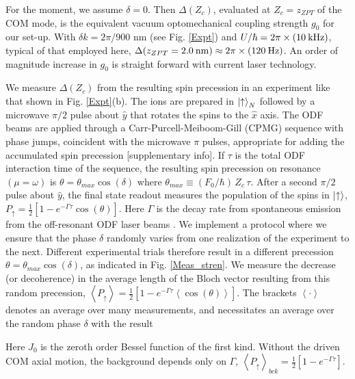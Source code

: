 \documentclass[aps,prl,twocolumn,superscriptaddress,floatfix,nofootinbib]{revtex4-1}
\begin{document}
For the moment, we assume $\delta=0$. Then $\Delta(Z_c)$, evaluated at $Z_c = z_{ZPT}$ of the COM mode, is the equivalent vacuum optomechanical coupling strength $g_0$ \citep{Aspelmeyer2014} for our set-up. With $\delta k =2\pi/900$ nm (see Fig. \ref{Expt}) and $U/\hbar = 2\pi \times (10\:\rm{kHz})$, typical of that employed here, $\Delta(z_{ZPT} = 2.0\:\rm{nm}) \approx 2\pi \times (120\:\rm{Hz})$. An order of magnitude increase in $g_0$ is straight forward with current laser technology.

We measure $\Delta(Z_c)$ from the resulting spin precession in an experiment like that shown in Fig. \ref{Expt}(b). The ions are prepared in $\ket{\uparrow}_N$ followed by a microwave $\pi/2$ pulse about $\hat{y}$ that rotates the spins to the $\hat{x}$ axis. The ODF beams are applied through a Carr-Purcell-Meiboom-Gill (CPMG) sequence with phase jumps, coincident with the microwave $\pi$ pulses, appropriate for adding the accumulated spin precession \citep{Kotler2011}[supplementary info]. If $\tau$ is the total ODF interaction time of the sequence, the resulting spin precession on resonance $(\mu = \omega)$ is $\theta = \theta_{max} \cos(\delta)$ where $\theta_{max} \equiv (F_{0}/\hbar)\, Z_c \, \tau$. After a second $\pi/2$ pulse about $\hat{y}$, the final state readout measures the population of the spins in $\ket{\uparrow}$, $P_{\uparrow} = \frac{1}{2}[1-e^{-\Gamma \tau}\cos(\theta)]$. Here $\Gamma$ is the decay rate from spontaneous emission from the off-resonant ODF laser beams \citep{Uys2010}. We implement a protocol where we ensure that the phase $\delta$ randomly varies from one realization of the experiment to the next. Different experimental trials therefore result in a different precession $\theta = \theta_{max} \cos(\delta)$, as indicated in Fig. \ref{Meas_stren}. We measure the decrease (or decoherence) in the average length of the Bloch vector resulting from this random precession, $\left< P_{\uparrow} \right> = \frac{1}{2}[1-e^{-\Gamma \tau} \left<\cos(\theta)\right>]$. The brackets $ \left< \cdot \right> $ denotes an average over many measurements, and necessitates an average over the random phase $\delta$ with the result \citep{Kotler2013}

Here $J_0$ is the zeroth order Bessel function of the first kind. Without the driven COM axial motion, the background depends only on $\Gamma$, $\left\langle P_{\uparrow}\right\rangle _{bck}= \frac{1}{2}\left[1-e^{-\Gamma\tau}\right]$.
\end{document}
